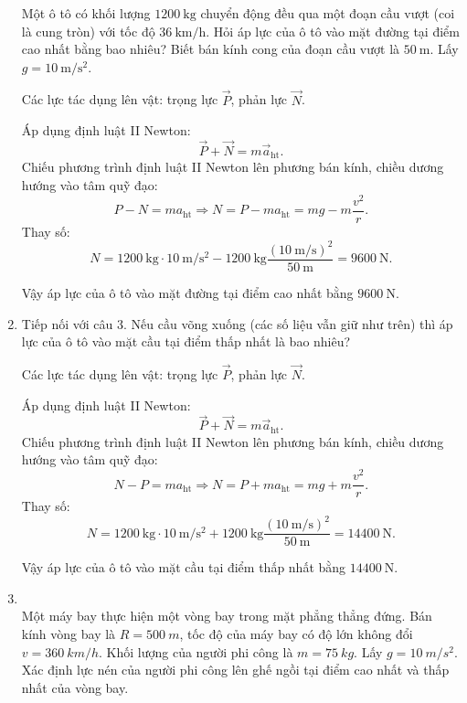 \begin{enumerate}[label=\bfseries Câu \arabic*:]
	
	{
		Một ô tô có khối lượng $\SI{1200}{\kilogram}$ chuyển động đều qua một đoạn cầu vượt (coi là cung tròn) với tốc độ $\SI{36}{\kilo \meter / \hour}$. Hỏi áp lực của ô tô vào mặt đường tại điểm cao nhất bằng bao nhiêu? Biết bán kính cong của đoạn cầu vượt là $\SI{50}{\meter}$. Lấy $g=\SI{10}{\meter / \second ^2}$.
	}
	
	\hideall
	{	Các lực tác dụng lên vật: trọng lực $\vec P$, phản lực $\vec N$.
		
		Áp dụng định luật II Newton:
		$$\vec P + \vec N = m \vec a_\text{ht}.$$
	Chiếu phương trình định luật II Newton lên phương bán kính, chiều dương hướng vào tâm quỹ đạo:
		$$P-N=ma_\text {ht} \Rightarrow N=P-ma_\text{ht} = mg - m \dfrac{v^2}{r}.$$
		Thay số:
		$$N=\SI{1200}{\kilogram} \cdot \SI{10}{\meter / \second ^2} - \SI{1200}{\kilogram} \dfrac{(\SI{10}{\meter / \second})^2}{\SI{50}{\meter}} = \SI{9600}{\newton}.$$
		
		Vậy áp lực của ô tô vào mặt đường tại điểm cao nhất bằng $\SI{9600}{\newton}$.
	}
	\item {}
	
	
	{
		Tiếp nối với câu 3. Nếu cầu võng xuống (các số liệu vẫn giữ như trên) thì áp lực của ô tô vào mặt cầu tại điểm thấp nhất là bao nhiêu?
	}
	
	\hideall
	{	
		Các lực tác dụng lên vật: trọng lực $\vec P$, phản lực $\vec N$.
		
		Áp dụng định luật II Newton:
		$$\vec P + \vec N = m \vec a_\text{ht}.$$
		Chiếu phương trình định luật II Newton lên phương bán kính, chiều dương hướng vào tâm quỹ đạo:
		$$N-P=ma_\text {ht} \Rightarrow N=P+ma_\text{ht} = mg + m \dfrac{v^2}{r}.$$
		Thay số:
		$$N=\SI{1200}{\kilogram} \cdot \SI{10}{\meter / \second ^2} + \SI{1200}{\kilogram} \dfrac{(\SI{10}{\meter / \second})^2}{\SI{50}{\meter}} = \SI{14400}{\newton}.$$
		
		Vậy áp lực của ô tô vào mặt cầu tại điểm thấp nhất bằng $\SI{14400}{\newton}$.
	}
	
	

	

\item {}\\
{Một máy bay thực hiện một vòng bay trong mặt phẳng thẳng đứng. Bán kính vòng bay là $R= \SI{500}{m}$, tốc độ của máy bay có độ lớn không đổi $v=\SI{360}{km/h}$. Khối lượng của người phi công là $m=\SI{75}{kg}$. Lấy $g=\SI{10}{m/s^2}$. Xác định lực nén của người phi công lên ghế ngồi tại điểm cao nhất và thấp nhất của vòng bay.
}
\end{enumerate}
